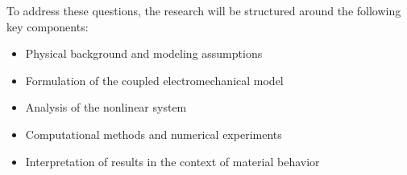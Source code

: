 To address these questions, the research will be structured around the following key components:

\begin{itemize}
    \item Physical background and modeling assumptions
    \item Formulation of the coupled electromechanical model
    \item Analysis of the nonlinear system
    \item Computational methods and numerical experiments
    \item Interpretation of results in the context of material behavior
\end{itemize}

